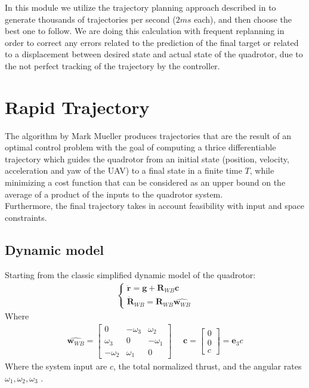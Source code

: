 In this module we utilize the trajectory planning approach described in \cite{mueller2015computationally} to generate thousands of trajectories per second ($2ms$ each), and then choose the best one to follow. We are doing this calculation with frequent replanning in order to correct any errors related to the prediction of the final target or related to a displacement between desired state and actual state of the quadrotor, due to the not perfect tracking of the trajectory by the controller.\\

\section{Rapid Trajectory}
The algorithm by Mark Mueller  produces trajectories that are the result of an optimal control problem with the goal of computing a thrice differentiable trajectory which guides the quadrotor from an initial state (position, velocity, acceleration and yaw of the UAV) to a final state in a finite time $T$, while minimizing a cost function that can be considered as an upper bound on the average of a product of the inputs to the quadrotor system.\\ Furthermore, the final trajectory takes in account feasibility with input and space constraints.
\subsection{Dynamic model}
Starting from the classic simplified dynamic model of the quadrotor:
\begin{align}
\begin{cases}
\ddot{\boldsymbol{r}} = \boldsymbol{g} + \boldsymbol{R}_{WB}\boldsymbol{c}  \\[10pt]
\dot{\boldsymbol{R}}_{WB} = \boldsymbol{R}_{WB}\hat{\boldsymbol{w}_{WB}}
\end{cases}
\label{eq:dynamic_jerk}
\end{align}
Where 
\begin{align}
\hat{\boldsymbol{w}_{WB}} =
{\begin{bmatrix}
0 & -\omega_3 & \omega_2 \\[10pt]
\omega_3 & 0 & -\omega_1 \\[10pt]
-\omega_2 & \omega_1  & 0
\end{bmatrix}} \ \ \ \ \ \ \boldsymbol{c} = 
{\begin{bmatrix}
0 \\[10pt]
0 \\[10pt]
c
\end{bmatrix}} = \boldsymbol{e}_3c
\end{align}
Where the system input are  $c$, the total normalized thrust, and the angular rates $\omega_1,\omega_2,\omega_3$ .\\

